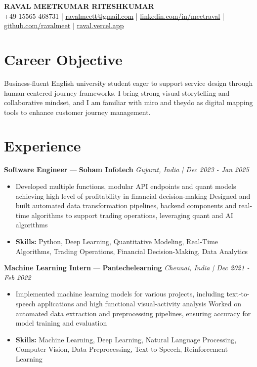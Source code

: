\documentclass[a4paper,10pt]{article}
\begin{document}
\begin{center}
  {\Large\bfseries RAVAL MEETKUMAR RITESHKUMAR}\\[2pt]
  {\small +49 15565 468731 \;|\; \href{mailto:ravalmeett@gmail.com}{ravalmeett@gmail.com} \;|\; \href{https://www.linkedin.com/in/meetraval/}{linkedin.com/in/meetraval} \;|\; \href{https://github.com/ravalmeet}{github.com/ravalmeet} \;|\; \href{https://raval.vercel.app/}{raval.vercel.app}}
\end{center}
\vspace{-3pt}

\section*{Career Objective}
Business-fluent English university student eager to support service design through human-centered journey frameworks. I bring strong visual storytelling and collaborative mindset, and I am familiar with miro and theydo as digital mapping tools to enhance customer journey management.\par

\section*{Experience}
\textbf{Software Engineer} — \textbf{Soham Infotech} \hfill \textit{Gujarat, India \;|\; Dec 2023 - Jan 2025}\par
\vspace{1pt}
\begin{itemize}
  \item Developed multiple functions, modular API endpoints and quant models achieving high level of profitability in financial decision-making Designed and built automated data transformation pipelines, backend components and real-time algorithms to support trading operations, leveraging quant and AI algorithms
  \item \textbf{Skills:} Python, Deep Learning, Quantitative Modeling, Real-Time Algorithms, Trading Operations, Financial Decision-Making, Data Analytics
\end{itemize}
\vspace{3pt}
\textbf{Machine Learning Intern} — \textbf{Pantechelearning} \hfill \textit{Chennai, India \;|\; Dec 2021 - Feb 2022}\par
\vspace{1pt}
\begin{itemize}
  \item Implemented machine learning models for various projects, including text-to-speech applications and high functional visual-activity analysis Worked on automated data extraction and preprocessing pipelines, ensuring accuracy for model training and evaluation
  \item \textbf{Skills:} Machine Learning, Deep Learning, Natural Language Processing, Computer Vision, Data Preprocessing, Text-to-Speech, Reinforcement Learning
\end{itemize}
\end{document}
